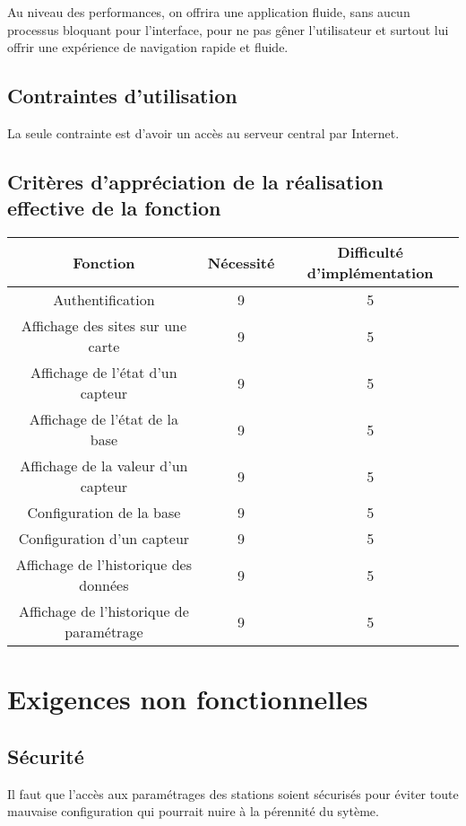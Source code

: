 Au niveau des performances, on offrira une application fluide, sans aucun processus bloquant pour l'interface, pour ne pas gêner l'utilisateur et surtout lui offrir une expérience de navigation rapide et fluide.

\subsection{Contraintes d'utilisation}
La seule contrainte est d'avoir un accès au serveur central par Internet.

\subsection{Critères d'appréciation de la réalisation effective de la fonction}

\begin{tabular}{|c|c|c|}
	\hline Fonction & Nécessité & Difficulté d'implémentation\\
	\hline 
	 Authentification & 9 & 5\\
	 Affichage des sites sur une carte & 9 & 5\\
	 Affichage de l'état d'un capteur & 9 & 5\\
	 Affichage de l'état de la base & 9 & 5\\
	 Affichage de la valeur d'un capteur & 9 & 5\\
	 Configuration de la base & 9 & 5\\
	 Configuration d'un capteur & 9 & 5\\
	 Affichage de l'historique des données & 9 & 5\\
	 Affichage de l'historique de paramétrage & 9 & 5\\
	\hline
\end{tabular}


\section{Exigences non fonctionnelles}
\subsection{Sécurité}
Il faut que l'accès aux paramétrages des stations soient sécurisés pour éviter toute mauvaise configuration qui pourrait nuire à la pérennité du sytème.

